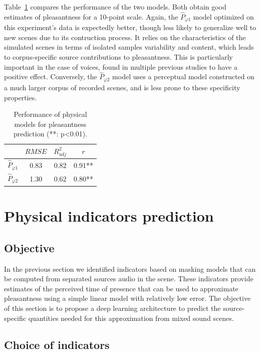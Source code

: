 \documentclass[11pt,a4paper]{article}
\begin{document}
Table~\ref{tab:physm} compares the performance of the two models. Both obtain good estimates of pleasantness for a 10-point scale. Again, the $\hat P_{\varphi 1}$ model optimized on this experiment's data is expectedly better, though less likely to generalize well to new scenes due to its contruction process. It relies on the characteristics of the simulated scenes in terms of isolated samples variability and content, which leads to corpus-specific source contributions to pleasantness. This is particularly important in the case of voices, found in multiple previous studies to have a positive effect. Conversely, the $\hat P_{\varphi 2}$ model uses a perceptual model constructed on a much larger corpus of recorded scenes, and is less prone to these specificity properties.

\begin{table}[t]
\centering
\caption{Performance of physical models for pleasantness prediction (**: p<0.01).}
\label{tab:physm}
\begin{tabular}{ c | c | c | c }
\hline
	 & $RMSE$ & $R^2_{adj}$ & $r$ \\ \hline
	$\hat P_{\varphi 1}$ & 0.83 & 0.82 & 0.91** \\
	$\hat P_{\varphi 2}$ & 1.30 & 0.62 & 0.80** \\ \hline
\end{tabular}
\end{table}



\section{Physical indicators prediction}

\subsection{Objective}

In the previous section we identified indicators based on masking models that can be computed from separated sources audio in the scene. These indicators provide estimates of the perceived time of presence that can be used to approximate pleasantness using a simple linear model with relatively low error. The objective of this section is to propose a deep learning architecture to predict the source-specific quantities needed for this approximation from mixed sound scenes.

\subsection{Choice of indicators}
\end{document}
